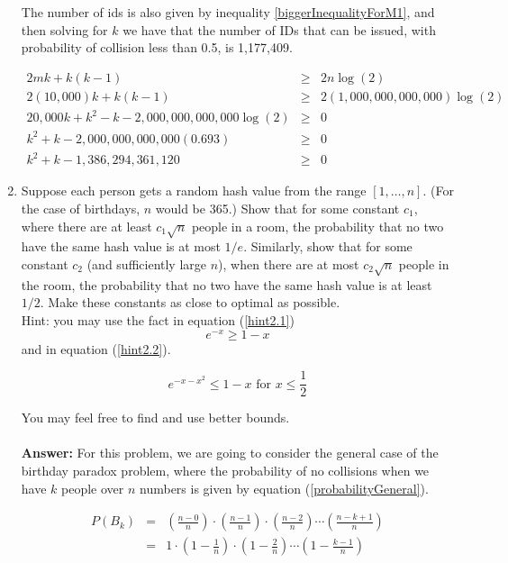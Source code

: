 \documentclass[tikz, 12pt]{scrartcl}
\begin{document}
\begin{enumerate}
	The number of ids is also given by inequality \ref{biggerInequalityForM1}, and then solving for $k$ we have that the number of IDs that can be issued, with probability of collision less than 0.5, is 1,177,409. 
	
	\begin{eqnarray}
	2mk + k(k - 1)						&	\geq	&	2n \log(2) \nonumber \\
	2(10,000)k + k(k - 1)					&	\geq	&	2( 1,000,000,000,000) \log(2) \nonumber \\
	20,000k + k^2 - k -  2,000,000,000,000 \log(2)	&	\geq	& 	0 \nonumber \\
	k^2 + k -  2,000,000,000,000(0.693)		&	\geq	&	0 \nonumber \\
	k^2 + k - 1,386,294,361,120		&	\geq	&	0 \label{biggerInequalityForM1}
	\end{eqnarray}

	
	\item Suppose each person gets a random hash value from the range $[1, \ldots, n]$. (For the case of birthdays, $n$ would be 365.) Show that for some constant $c_1$, where there are at least $c_1 \sqrt{n}$ people in a room, the probability that no two have the same hash value is at most $1/e$. Similarly, show that for some constant $c_2$ (and sufficiently large $n$), when there are at most $c_2 \sqrt{n}$ people in the room, the probability that no two have the same hash value is at least $1/2$. Make these constants as close to optimal as possible.\\
	Hint: you may use the fact in equation (\ref{hint2.1})
	\begin{equation}\label{hint2.1}
		e^{-x} \geq 1 - x
	\end{equation}
	and in equation (\ref{hint2.2}).
	
	\begin{equation}\label{hint2.2}
	e^{-x - x^2} \leq 1 - x \mbox{ for } x \leq \frac{1}{2}
	\end{equation}
	
	You may feel free to find and use better bounds.\\
	\\
	\textbf{Answer: } For this problem, we are going to consider the general case of the birthday paradox problem, where the probability of no collisions when we have $k$ people over $n$ numbers is given by equation (\ref{probabilityGeneral}).
	
	\begin{eqnarray}
	P(B_k) 	&	=	&	\left( \frac{n - 0}{n} \right) \cdot  \left( \frac{n - 1}{n} \right) \cdot \left( \frac{n - 2}{n} \right)\cdots\left( \frac{n - k + 1}{n} \right) \nonumber \\
			&	=	&	1 \cdot \left(1 -  \frac{1}{n} \right)\cdot \left(1 -  \frac{2}{n} \right) \cdots \left(1 -  \frac{k-1}{n} \right)\label{probabilityGeneral}
	\end{eqnarray}
	

\end{enumerate}
\end{document}
